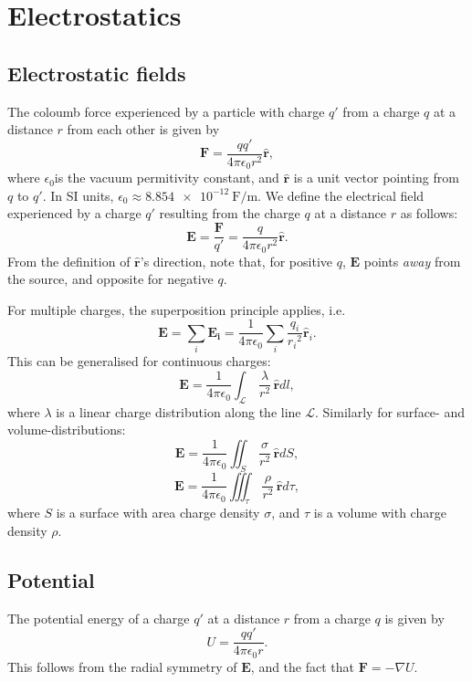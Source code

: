 \documentclass[a4paper, 12pt]{article}
\renewcommand{\vec}[1]{\bm{#1}}
\newcommand{\E}{\ensuremath{\vec{E}}}
\newcommand{\e}{\ensuremath{\epsilon_0}}
\let\tmp\hat
\renewcommand{\hat}[1]{\vec{\tmp{#1}}}
\begin{document}
\section{Electrostatics}
\subsection{Electrostatic fields}
    The coloumb force experienced by a particle with charge $q'$ from a charge $q$ at a distance $r$ from each other is given by 
    \begin{equation}
        \vec{F} = \frac{qq'}{4\pi\e r^2}\hat{r},
    \end{equation}
    where \e is the vacuum permitivity constant, and $\hat{r}$ is a unit vector pointing from $q$ to $q'$. 
    In SI units, $\e \approx \SI{8.854e-12}{\farad \per \metre}$.
    We define the electrical field experienced by a charge $q'$ resulting from the charge $q$ at a distance $r$ as follows:
    \begin{equation}
        \E = \frac{\vec{F}}{q'} = \frac{q}{4\pi\e r^2}\hat{r}.
    \end{equation}
    From the definition of $\hat{r}$'s direction, note that, for positive $q$, 
    \E{} points \textit{away} from the source, and opposite for negative $q$.
    
    For multiple charges, the superposition principle applies, i.e. 
    \begin{equation}
        \E = \sum_i\vec{E_i} = \frac{1}{4\pi\e}\sum_i\frac{q_i}{{r_i}^2}\hat{r}_i.
    \end{equation}
    This can be generalised for continuous charges: 
    \begin{equation}
        \E = \frac{1}{4\pi\e}\int_\mathcal{L}\,\frac{\lambda}{r^2}\,\hat{r}dl,
    \end{equation}
    where $\lambda$ is a linear charge distribution along the line $\mathcal{L}$. Similarly for surface- and volume-distributions: 
    \begin{equation}
        \E = \frac{1}{4\pi\e}\iint_S\,\frac{\sigma}{r^2}\,\hat{r}dS,
    \end{equation}
    \begin{equation}
        \E = \frac{1}{4\pi\e}\iiint_{\tau}\,\frac{\rho}{r^2}\,\hat{r}d\tau,
    \end{equation}
    where $S$ is a surface with area charge density $\sigma$, and $\tau$ is a volume with charge density $\rho$.
    
\subsection{Potential}
    The potential energy of a charge $q'$ at a distance $r$ from a charge $q$ is given by
    \begin{equation}
        U = \frac{qq'}{4\pi\e r}.
    \end{equation}
    This follows from the radial symmetry of \E, and the fact that $\vec{F} = - \nabla U$.
    
\end{document}
